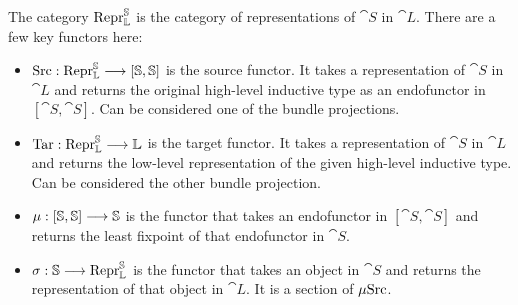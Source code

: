The category $\mathrm{Repr} _{\mathbb L} ^{\mathbb S}$ is the category of representations of
$\cat S$ in $\cat L$. There are a few key functors here:
\begin{itemize}
  \item $\mathrm {Src} : \mathrm{Repr} _{\mathbb L} ^{\mathbb S} \longrightarrow [\mathbb S, \mathbb S]$ is the source
        functor. It takes a representation of $\cat S$ in $\cat L$ and returns the
        original high-level inductive type as an endofunctor in $[\cat S, \cat S]$.
        Can be considered one of the bundle projections.
  \item $\mathrm {Tar} : \mathrm{Repr} _{\mathbb L} ^{\mathbb S} \longrightarrow \mathbb L$ is the target
        functor. It takes a representation of $\cat S$ in $\cat L$ and returns the
        low-level representation of the given high-level inductive type. Can be considered
        the other bundle projection.
  \item $\mu : [\mathbb S, \mathbb S] \longrightarrow \mathbb S$ is the
        functor that takes an endofunctor in $[\cat S, \cat S]$ and returns the
        least fixpoint of that endofunctor in $\cat S$.
  \item $\sigma : \mathbb S \longrightarrow \mathrm{Repr} _{\mathbb L} ^{\mathbb S}$ is the functor
        that takes an object in $\cat S$ and returns the representation of that
        object in $\cat L$. It is a section of $\mu \mathrm {Src}$.
\end{itemize}

